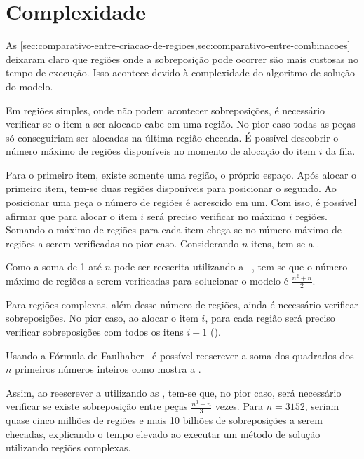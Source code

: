 \section{Complexidade}\label{sec:complexidade}

As \cref{sec:comparativo-entre-criacao-de-regioes,sec:comparativo-entre-combinacoes} deixaram claro
que regiões onde a sobreposição pode ocorrer são mais custosas no tempo de execução.
Isso acontece devido à complexidade do algoritmo de solução do modelo.

Em regiões simples, onde não podem acontecer sobreposições, é necessário verificar se o item a ser
alocado cabe em uma região.
No pior caso todas as peças só conseguiriam ser alocadas na última região checada.
É possível descobrir o número máximo de regiões disponíveis no momento de alocação do item $i$ da
fila.

Para o primeiro item, existe somente uma região, o próprio espaço.
Após alocar o primeiro item, tem-se duas regiões disponíveis para posicionar o segundo.
Ao posicionar uma peça o número de regiões é acrescido em um.
Com isso, é possível afirmar que para alocar o item $i$ será preciso verificar no máximo $i$ regiões.
Somando o máximo de regiões para cada item chega-se no número máximo de regiões a serem verificadas
no pior caso.
Considerando $n$ itens, tem-se a .



Como a soma de 1 até $n$ pode ser reescrita utilizando a 
~\cite{merca2015alternative}, tem-se que o número máximo de regiões a serem verificadas
para solucionar o modelo é $\frac{n^2 + n}{2}$.



Para regiões complexas, além desse número de regiões, ainda é necessário verificar sobreposições.
No pior caso, ao alocar o item $i$, para cada região será preciso verificar sobreposições com
todos os itens $i - 1$ ().



Usando a Fórmula de Faulhaber~\cite{merca2015alternative} é possível reescrever a soma dos quadrados
dos $n$ primeiros números inteiros como mostra a .



Assim, ao reescrever a  utilizando as ,
tem-se que, no pior caso, será necessário verificar se existe sobreposição entre peças
$\frac{n^3-n}{3}$ vezes.
Para $n = 3152$, seriam quase cinco milhões de regiões e mais 10 bilhões de sobreposições a serem
checadas, explicando o tempo elevado ao executar um método de solução utilizando regiões complexas.